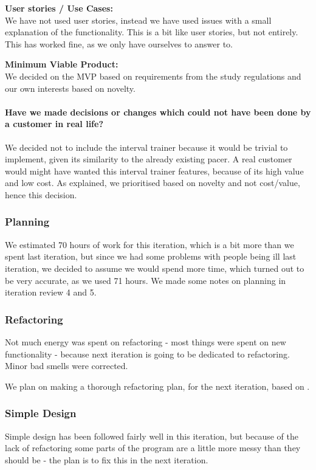 \textbf{User stories / Use Cases:}\\
We have not used user stories, instead we have used issues with a small explanation of the functionality. This is a bit like user stories, but not entirely. This has worked fine, as we only have ourselves to answer to.

\textbf{Minimum Viable Product:}\\
We decided on the MVP based on requirements from the study regulations and our own interests based on novelty.

\paragraph{Have we made decisions or changes which could not have been done by a customer in real life?}
We decided not to include the interval trainer because it would be trivial to implement, given its similarity to the already existing pacer.
A real customer would might have wanted this interval trainer features, because of its high value and low cost. As explained, we prioritised based on novelty and not cost/value, hence this decision.



\subsubsection{Planning}
We estimated 70 hours of work for this iteration, which is a bit more than we spent last iteration, but since we had some problems with people being ill last iteration, we decided to assume we would spend more time, which turned out to be very accurate, as we used 71 hours. We made some notes on planning in iteration review 4 and 5.

\subsubsection{Refactoring}
Not much energy was spent on refactoring - most things were spent on new functionality - because next iteration is going to be dedicated to refactoring.
Minor bad smells were corrected.

We plan on making a thorough refactoring plan, for the next iteration, based on \citet{fowler:refac}.


\subsubsection{Simple Design}
Simple design has been followed fairly well in this iteration, but because of the lack of refactoring some parts of the program are a little more messy than they should be - the plan is to fix this in the next iteration.

